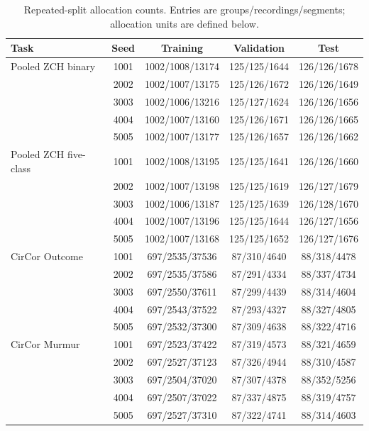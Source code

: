 \begin{table}[H]
\centering\color{black}
\caption{Repeated-split allocation counts. Entries are groups/recordings/segments; allocation units are defined below.}\label{tab:supp_split_counts}
\begingroup
\fontsize{8.8}{10.2}\selectfont
\setlength{\tabcolsep}{6pt}\renewcommand{\arraystretch}{1.03}
\begin{tabular*}{\linewidth}{@{\extracolsep{\fill}}lcccc@{}}\toprule
\textbf{Task} & \textbf{Seed} & \textbf{Training} & \textbf{Validation} & \textbf{Test}\\\midrule
Pooled ZCH binary & 1001 & 1002/1008/13174 & 125/125/1644 & 126/126/1678\\
 & 2002 & 1002/1007/13175 & 125/126/1672 & 126/126/1649\\
 & 3003 & 1002/1006/13216 & 125/127/1624 & 126/126/1656\\
 & 4004 & 1002/1007/13160 & 125/126/1671 & 126/126/1665\\
 & 5005 & 1002/1007/13177 & 125/126/1657 & 126/126/1662\\
\midrule
Pooled ZCH five-class & 1001 & 1002/1008/13195 & 125/125/1641 & 126/126/1660\\
 & 2002 & 1002/1007/13198 & 125/125/1619 & 126/127/1679\\
 & 3003 & 1002/1006/13187 & 125/125/1639 & 126/128/1670\\
 & 4004 & 1002/1007/13196 & 125/125/1644 & 126/127/1656\\
 & 5005 & 1002/1007/13168 & 125/125/1652 & 126/127/1676\\
\midrule
CirCor Outcome & 1001 & 697/2535/37536 & 87/310/4640 & 88/318/4478\\
 & 2002 & 697/2535/37586 & 87/291/4334 & 88/337/4734\\
 & 3003 & 697/2550/37611 & 87/299/4439 & 88/314/4604\\
 & 4004 & 697/2543/37522 & 87/293/4327 & 88/327/4805\\
 & 5005 & 697/2532/37300 & 87/309/4638 & 88/322/4716\\
\midrule
CirCor Murmur & 1001 & 697/2523/37422 & 87/319/4573 & 88/321/4659\\
 & 2002 & 697/2527/37123 & 87/326/4944 & 88/310/4587\\
 & 3003 & 697/2504/37020 & 87/307/4378 & 88/352/5256\\
 & 4004 & 697/2507/37022 & 87/337/4875 & 88/319/4757\\
 & 5005 & 697/2527/37310 & 87/322/4741 & 88/314/4603\\
\bottomrule\end{tabular*}
\endgroup
{}
\end{table}

